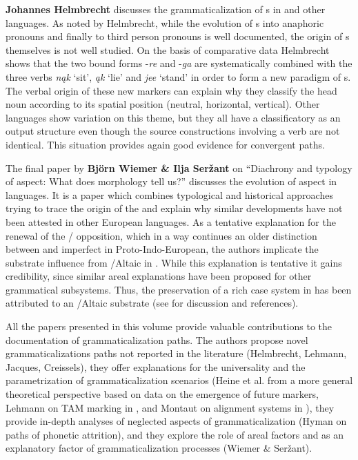 \documentclass[output=paper]{LSP/langsci}
\begin{document}
\textbf{Johannes Helmbrecht} discusses the grammaticalization of s in  and other  languages.\textbf{} As noted by Helmbrecht, while the evolution of s into anaphoric pronouns and finally to third person pronouns is well documented, the origin of s themselves is not well studied. On the basis of comparative  data Helmbrecht shows that the two bound  forms -\textit{re} and -\textit{ga} are systematically combined with the three  verbs \textit{nąk} ‘sit', \textit{ąk} ‘lie' and \textit{jee} ‘stand' in order to form a new paradigm of s. The verbal origin of these new  markers can explain why they classify the head noun according to its spatial position (neutral, horizontal, vertical). Other  languages show variation on this theme, but they all have a classificatory  as an output structure even though the source constructions involving a  verb are not identical. This situation provides again good evidence for convergent paths. 

The final paper by \textbf{Björn Wiemer \& Ilja Seržant} on “Diachrony and typology of  aspect: What does morphology tell us?”\textbf{} discusses the evolution of aspect in  languages. It is a paper which combines typological and historical approaches trying to trace the origin of the   and explain why similar developments have not been attested in other European languages. As a tentative explanation for the renewal of the / opposition, which in a way continues an older distinction between  and imperfect in Proto-Indo-European, the authors implicate the substrate influence from /Altaic in . While this explanation is tentative it gains credibility, since similar areal explanations have been proposed for other grammatical subsystems. Thus, the preservation of a rich case system in  has been attributed to an /Altaic substrate (see \citealt{Kulikov2009} for discussion and references). 

\largerpage All the papers presented in this volume provide valuable contributions to the documentation of grammaticalization paths. The authors propose novel grammaticalizations paths not reported in the literature (Helmbrecht, Lehmann, Jacques, Creissels), they offer explanations for the universality and the parametrization of grammaticalization scenarios (Heine et al. from a more general theoretical perspective based on data on the emergence of future markers, Lehmann on TAM marking in  , and Montaut on alignment systems in ), they provide in-depth analyses of neglected aspects of grammaticalization (Hyman on paths of phonetic attrition), and they explore the role of areal factors and  as an explanatory factor of grammaticalization processes (Wiemer \& Seržant).
\end{document}
